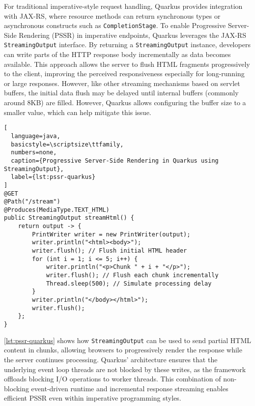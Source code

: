 For traditional imperative-style request handling, Quarkus provides integration
with JAX-RS, where resource methods can return synchronous types or
asynchronous constructs such as \texttt{CompletionStage}. To enable Progressive
Server-Side Rendering (PSSR) in imperative endpoints, Quarkus leverages the
JAX-RS \texttt{StreamingOutput} interface. By returning a
\texttt{StreamingOutput} instance, developers can write parts of the HTTP
response body incrementally as data becomes available. This approach allows the
server to flush HTML fragments progressively to the client, improving the
perceived responsiveness especially for long-running or large responses.
However, like other streaming mechanisms based on servlet buffers, the initial
data flush may be delayed until internal buffers (commonly around 8KB) are
filled. However, Quarkus allows configuring the buffer size to a smaller value, which
can help mitigate this issue.

\begin{lstlisting}[
  language=java,
  basicstyle=\scriptsize\ttfamily,
  numbers=none,
  caption={Progressive Server-Side Rendering in Quarkus using StreamingOutput},
  label={lst:pssr-quarkus}
]
@GET
@Path("/stream")
@Produces(MediaType.TEXT_HTML)
public StreamingOutput streamHtml() {
    return output -> {
        PrintWriter writer = new PrintWriter(output);
        writer.println("<html><body>");
        writer.flush(); // Flush initial HTML header
        for (int i = 1; i <= 5; i++) {
            writer.println("<p>Chunk " + i + "</p>");
            writer.flush(); // Flush each chunk incrementally
            Thread.sleep(500); // Simulate processing delay
        }
        writer.println("</body></html>");
        writer.flush();
    };
}
\end{lstlisting}

\autoref{lst:pssr-quarkus} shows how \texttt{StreamingOutput} can be used to send
partial HTML content in chunks, allowing browsers to progressively render the
response while the server continues processing. Quarkus’ architecture ensures
that the underlying event loop threads are not blocked by these writes, as the
framework offloads blocking I/O operations to worker threads. This combination
of non-blocking event-driven runtime and incremental response streaming enables
efficient PSSR even within imperative programming styles.


